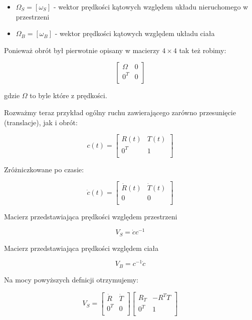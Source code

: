 \documentclass{article}
\begin{document}
\begin{itemize}
    \item $\Omega_{S} = \left[\omega_{S}\right]$ - wektor prędkości kątowych względem układu nieruchomego w przestrzeni
    \item $\Omega_{B} = \left[\omega_{B}\right]$ - wektor prędkości kątowych względem układu ciała
\end{itemize}

Ponieważ obrót był pierwotnie opisany w macierzy $4\times4$ tak też robimy:

$$
    \begin{bmatrix}
        \Omega & 0 \\[0.3em]
        0^{T}  & 0 \\[0.3em]
    \end{bmatrix}
$$

gdzie $\Omega$ to byle które z prędkości.



Rozważmy teraz przykład ogólny ruchu zawierającego zarówno przesunięcie (translacje), jak i obrót:

$$
    c(t)=
    \begin{bmatrix}
        R(t)  & T(t) \\[0.3em]
        0^{T} & 1    \\[0.3em]
    \end{bmatrix}
$$

Zróżniczkowane po czasie:


$$
    \dot c(t)=
    \begin{bmatrix}
        \dot R(t) & \dot T(t) \\[0.3em]
        0         & 0         \\[0.3em]
    \end{bmatrix}
$$



Macierz przedstawiająca prędkości względem przestrzeni

$$
    V_{S} = \dot c c^{-1}
$$



Macierz przedstawiająca prędkości względem ciała

$$
    V_{B} = c^{-1} \dot c
$$

Na mocy powyższych defnicji otrzymujemy:

$$
    V_{S}=
    \begin{bmatrix}
        \dot R & \dot T \\[0.3em]
        0^{T}  & 0      \\[0.3em]
    \end{bmatrix}
    \begin{bmatrix}
        R_{T} & -R^{T}T \\[0.3em]
        0^{T} & 1       \\[0.3em]
    \end{bmatrix}
$$
\end{document}
